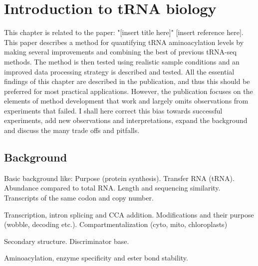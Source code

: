 \chapter{Introduction to tRNA biology}
\label{chap4}


This chapter is related to the paper: "[insert title here]" [insert reference here].
This paper describes a method for quantifying tRNA aminoacylation levels by making several improvements and combining the best of previous tRNA-seq methods.
The method is then tested using realistic sample conditions and an improved data processing strategy is described and tested.
All the essential findings of this chapter are described in the publication, and thus this should be preferred for most practical applications.
However, the publication focuses on the elements of method development that work and largely omits observations from experiments that failed.
I shall here correct this bias towards successful experiments, add new observations and interpretations, expand the background and discuss the many trade offs and pitfalls.


\section{Background}
Basic background like:
Purpose (protein synthesis).
Transfer RNA (tRNA).
Abundance compared to total RNA.
Length and sequencing similarity.
Transcripts of the same codon and copy number.

Transcription, intron splicing and CCA addition.
Modifications and their purpose (wobble, decoding etc.).
Compartmentalization (cyto, mito, chloroplasts)

Secondary structure.
Discriminator base.

Aminoacylation, enzyme specificity and ester bond stability.



